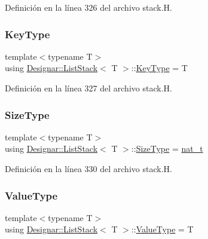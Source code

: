 Definición en la línea 326 del archivo stack.\+H.

\mbox{\label{class_designar_1_1_list_stack_adf88da10e96a685fa2cdd3fff029d52c}} 
\subsubsection{\texorpdfstring{Key\+Type}{KeyType}}
{\footnotesize\ttfamily template$<$typename T$>$ \\
using \hyperlink{class_designar_1_1_list_stack}{Designar\+::\+List\+Stack}$<$ T $>$\+::\hyperlink{class_designar_1_1_s_l_list_a0f9ac3eaee2d1a9e6091aaaac825ccb2}{Key\+Type} =  T}



Definición en la línea 327 del archivo stack.\+H.

\mbox{\label{class_designar_1_1_list_stack_ae1849f2d4064bd8602122eb9db436441}} 
\subsubsection{\texorpdfstring{Size\+Type}{SizeType}}
{\footnotesize\ttfamily template$<$typename T$>$ \\
using \hyperlink{class_designar_1_1_list_stack}{Designar\+::\+List\+Stack}$<$ T $>$\+::\hyperlink{class_designar_1_1_s_l_list_a253792b5e9c19ea61fb49e5e83f6159b}{Size\+Type} =  \hyperlink{namespace_designar_aa72662848b9f4815e7bf31a7cf3e33d1}{nat\+\_\+t}}



Definición en la línea 330 del archivo stack.\+H.

\mbox{\label{class_designar_1_1_list_stack_ac51dd165958a3e9ff0790e9f5791a4a5}} 
\subsubsection{\texorpdfstring{Value\+Type}{ValueType}}
{\footnotesize\ttfamily template$<$typename T$>$ \\
using \hyperlink{class_designar_1_1_list_stack}{Designar\+::\+List\+Stack}$<$ T $>$\+::\hyperlink{class_designar_1_1_s_l_list_a22813e78b0dea3a55f47d5f476fd99a1}{Value\+Type} =  T}



